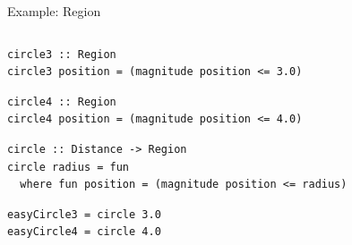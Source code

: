 \documentclass[8pt,aspectratio=169]{beamer}
\begin{document}
\begin{frame}[fragile]{Example: Region}
\begin{columns}[onlytextwidth]
\begin{column}{0.55\textwidth}
\pause
\begin{verbatim}
circle3 :: Region
circle3 position = (magnitude position <= 3.0)
\end{verbatim}

\pause
\begin{verbatim}
circle4 :: Region
circle4 position = (magnitude position <= 4.0)
\end{verbatim}

\pause
\begin{verbatim}
circle :: Distance -> Region
circle radius = fun
  where fun position = (magnitude position <= radius)
\end{verbatim}

\pause
\begin{verbatim}
easyCircle3 = circle 3.0
easyCircle4 = circle 4.0
\end{verbatim}

\end{column}
\end{columns}

\end{frame}

\end{document}
